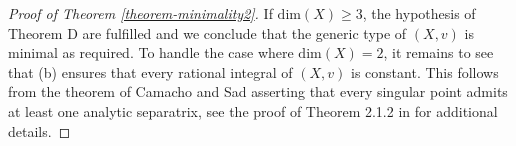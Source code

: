 \documentclass[12pt]{amsart}
\renewcommand{\P}{\mathbb{P}}
\theoremstyle{definition}
\theoremstyle{plain}
\theoremstyle{exampstyle}
\theoremstyle{exampstyle}\newtheorem{thmxbis}{Theorem}
\numberwithin{equation}{section}
\theoremstyle{remark}
\begin{document}
\begin{proof}[Proof of Theorem \ref{theorem-minimality2}]
If $\mathrm{dim}(X) \geq 3$, the hypothesis of Theorem D are fulfilled and we conclude that the generic type of $(X,v)$ is minimal as required. To handle the case where $\mathrm{dim}(X) = 2$, it remains to see that (b) ensures that every rational integral of $(X,v)$ is constant. This follows from the theorem of Camacho and Sad \cite{Camacho-Sad} asserting that every singular point admits at least one analytic separatrix, see the proof of Theorem 2.1.2 in \cite{jaoui-ANT} for additional details. 
\end{proof} 
%
%
%
%
%
%
%
\end{document}
